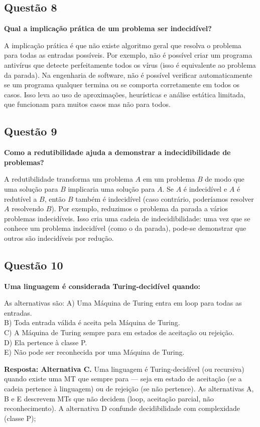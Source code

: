 \documentclass[conference]{IEEEtran}
\begin{document}
\subsection{Questão 8}
\textbf{Qual a implicação prática de um problema ser indecidível?}

A implicação prática é que não existe algoritmo geral que resolva o problema para todas as entradas possíveis. Por exemplo, não é possível criar um programa antivírus que detecte perfeitamente todos os vírus (isso é equivalente ao problema da parada). Na engenharia de software, não é possível verificar automaticamente se um programa qualquer termina ou se comporta corretamente em todos os casos. Isso leva ao uso de aproximações, heurísticas e análise estática limitada, que funcionam para muitos casos mas não para todos.

\subsection{Questão 9}
\textbf{Como a redutibilidade ajuda a demonstrar a indecidibilidade de problemas?}

A redutibilidade transforma um problema $A$ em um problema $B$ de modo que uma solução para $B$ implicaria uma solução para $A$. Se $A$ é indecidível e $A$ é redutível a $B$, então $B$ também é indecidível (caso contrário, poderíamos resolver $A$ resolvendo $B$). Por exemplo, reduzimos o problema da parada a vários problemas indecidíveis. Isso cria uma cadeia de indecidibilidade: uma vez que se conhece um problema indecidível (como o da parada), pode-se demonstrar que outros são indecidíveis por redução.

\subsection{Questão 10}
\textbf{Uma linguagem é considerada Turing-decidível quando:}

As alternativas são:
A) Uma Máquina de Turing entra em loop para todas as entradas. \\
B) Toda entrada válida é aceita pela Máquina de Turing. \\
C) A Máquina de Turing sempre para em estados de aceitação ou rejeição. \\
D) Ela pertence à classe P. \\
E) Não pode ser reconhecida por uma Máquina de Turing.

\textbf{Resposta: Alternativa C.} Uma linguagem é Turing-decidível (ou recursiva) quando existe uma MT que sempre para — seja em estado de aceitação (se a cadeia pertence à linguagem) ou de rejeição (se não pertence). As alternativas A, B e E descrevem MTs que não decidem (loop, aceitação parcial, não reconhecimento). A alternativa D confunde decidibilidade com complexidade (classe P);
\end{document}
